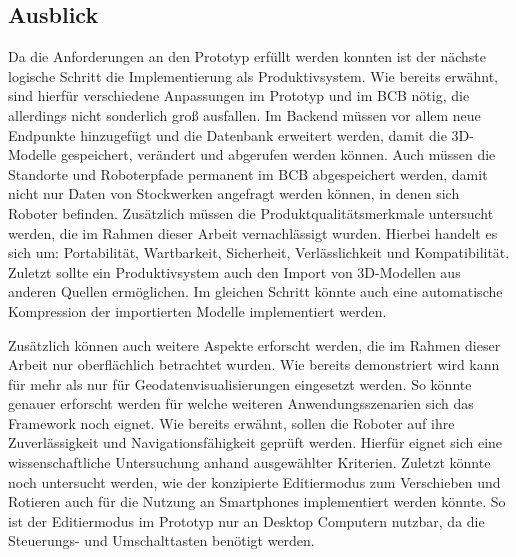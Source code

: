 
\subsection{Ausblick}
Da die Anforderungen an den Prototyp erfüllt werden konnten ist der nächste logische Schritt die Implementierung als Produktivsystem. Wie bereits erwähnt, sind hierfür verschiedene Anpassungen im Prototyp und im \ac{BCB} nötig, die allerdings nicht sonderlich groß ausfallen. Im Backend müssen vor allem neue Endpunkte hinzugefügt und die Datenbank erweitert werden, damit die 3D-Modelle gespeichert, verändert und abgerufen werden können. Auch müssen die Standorte und Roboterpfade permanent im \ac{BCB} abgespeichert werden, damit nicht nur Daten von Stockwerken angefragt werden können, in denen sich Roboter befinden. Zusätzlich müssen die Produktqualitätsmerkmale untersucht werden, die im Rahmen dieser Arbeit vernachlässigt wurden. Hierbei handelt es sich um: Portabilität, Wartbarkeit, Sicherheit, Verlässlichkeit und Kompatibilität. Zuletzt sollte ein Produktivsystem auch den Import von 3D-Modellen aus anderen Quellen ermöglichen. Im gleichen Schritt könnte auch eine automatische Kompression der importierten Modelle implementiert werden.

Zusätzlich können auch weitere Aspekte erforscht werden, die im Rahmen dieser Arbeit nur oberflächlich betrachtet wurden. Wie bereits demonstriert wird kann \deckgl{} für mehr als nur für Geodatenvisualisierungen eingesetzt werden. So könnte genauer erforscht werden für welche weiteren Anwendungsszenarien sich das Framework noch eignet. Wie bereits erwähnt, sollen die Roboter auf ihre Zuverlässigkeit und Navigationsfähigkeit geprüft werden. Hierfür eignet sich eine wissenschaftliche Untersuchung anhand ausgewählter Kriterien. Zuletzt könnte noch untersucht werden, wie der konzipierte Editiermodus zum Verschieben und Rotieren auch für die Nutzung an Smartphones implementiert werden könnte. So ist der Editiermodus im Prototyp nur an Desktop Computern nutzbar, da die Steuerungs- und Umschalttasten benötigt werden.

